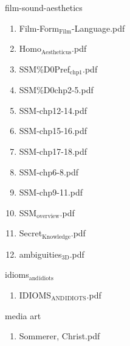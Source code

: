 \documentclass[11pt]{article}
\begin{document}
\item film-sound-aesthetics
\label{sec-1-1-1-1-11-24-38}
\begin{enumerate}
\item Film-Form$_{\text{Film}}$-Language.pdf
\label{sec-1-1-1-1-11-24-38-1}

\item Homo$_{\text{Aestheticus}}$.pdf
\label{sec-1-1-1-1-11-24-38-2}

\item SSM\%D0Pref$_{\text{chp1}}$.pdf
\label{sec-1-1-1-1-11-24-38-3}

\item SSM\%D0chp2-5.pdf
\label{sec-1-1-1-1-11-24-38-4}

\item SSM-chp12-14.pdf
\label{sec-1-1-1-1-11-24-38-5}

\item SSM-chp15-16.pdf
\label{sec-1-1-1-1-11-24-38-6}

\item SSM-chp17-18.pdf
\label{sec-1-1-1-1-11-24-38-7}

\item SSM-chp6-8.pdf
\label{sec-1-1-1-1-11-24-38-8}

\item SSM-chp9-11.pdf
\label{sec-1-1-1-1-11-24-38-9}

\item SSM$_{\text{overview}}$.pdf
\label{sec-1-1-1-1-11-24-38-10}

\item Secret$_{\text{Knowledge}}$.pdf
\label{sec-1-1-1-1-11-24-38-11}

\item ambiguities$_{\text{3D}}$.pdf
\label{sec-1-1-1-1-11-24-38-12}
\end{enumerate}

\item idioms$_{\text{and}}$$_{\text{idiots}}$
\label{sec-1-1-1-1-11-24-39}
\begin{enumerate}
\item IDIOMS$_{\text{AND}}$$_{\text{IDIOTS}}$.pdf
\label{sec-1-1-1-1-11-24-39-1}
\end{enumerate}

\item media art
\label{sec-1-1-1-1-11-24-40}
\begin{enumerate}
\item Sommerer, Christ.pdf
\label{sec-1-1-1-1-11-24-40-1}
\end{enumerate}
\end{document}
